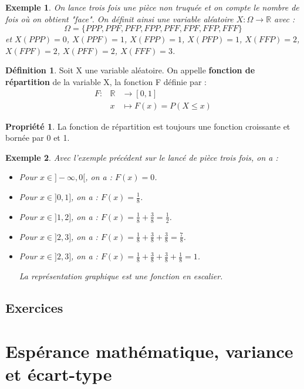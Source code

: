 \documentclass[a4paper,12pt,final]{article}
\newtheorem{Ex}{Exemple}[section]
\theoremstyle{theorem}
\theoremstyle{definition}
\newtheorem{Propriete}{Propriété}[section]
\theoremstyle{definition}
\theoremstyle{definition}
\newtheorem{Def}{Définition}[section]
\begin{document}
	\begin{Ex}
		On lance trois fois une pièce non truquée et on compte le nombre de fois où on obtient "face". On définit ainsi une variable aléatoire $X : \Omega \rightarrow \mathbb{R}$ avec : 
		\[\Omega = \{PPP,PPF,PFP,FPP,PFF,FPF,FFP,FFF\}\]
		et $X(PPP) = 0$, $X(PPF) = 1$, $X(FPP) = 1$, $X(PFP) = 1$, $X(FFP) = 2$,
		$X(FPF) = 2$, $X(PFF)= 2$, $X(FFF) = 3$.
	\end{Ex}

	\begin{Def}
		Soit X une variable aléatoire. On appelle \textbf{fonction de répartition} de la variable X, la fonction F définie par : 
		\[
			\begin{array}{lll}
				F: & \mathbb{R} & \rightarrow [0,1]	\\
				& x & \mapsto F(x) = P(X \leq x)
			\end{array}
		\]
	\end{Def}

	\begin{Propriete}
		La fonction de répartition est toujours une fonction croissante et bornée par 0 et 1.
	\end{Propriete}	

	\begin{Ex}
		Avec l'exemple précédent sur le lancé de pièce trois fois, on a : \\
		\begin{itemize}
			\item Pour $x \in ]-\infty,0[$, on a : $F(x) = 0$. 
			\item Pour $x \in ]0,1]$, on a : $F(x) = \frac{1}{8}$. 
			\item Pour $x \in ]1,2]$, on a : $F(x) = \frac{1}{8} + \frac{3}{8} = \frac{1}{2}$.
			\item Pour $x \in ]2,3]$, on a : $F(x) = \frac{1}{8} + \frac{3}{8} + \frac{3}{8} = \frac{7}{8}$.
			\item Pour $x \in ]2,3]$, on a : $F(x) = \frac{1}{8} + \frac{3}{8} + \frac{3}{8} + \frac{1}{8} = 1$.
			
			La représentation graphique est une fonction en escalier.
		\end{itemize}
	\end{Ex}
	
	\subsection{Exercices}

\section{Espérance mathématique, variance et écart-type}
\end{document}
